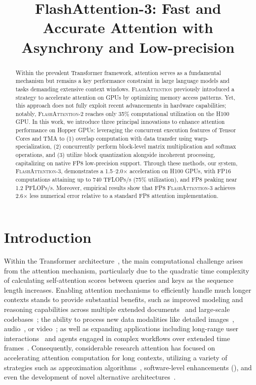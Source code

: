 \title{FlashAttention-3: Fast and Accurate Attention with Asynchrony and Low-precision}

\begin{abstract}
Within the prevalent Transformer framework, attention serves as a fundamental mechanism but remains a key performance constraint in large language models and tasks demanding extensive context windows. \textsc{FlashAttention} previously introduced a strategy to accelerate attention on GPUs by optimizing memory access patterns. Yet, this approach does not fully exploit recent advancements in hardware capabilities; notably, \textsc{FlashAttention-2} reaches only 35\% computational utilization on the H100 GPU. In this work, we introduce three principal innovations to enhance attention performance on Hopper GPUs: leveraging the concurrent execution features of Tensor Cores and TMA to (1) overlap computation with data transfer using warp-specialization, (2) concurrently perform block-level matrix multiplication and softmax operations, and (3) utilize block quantization alongside incoherent processing, capitalizing on native FP8 low-precision support. Through these methods, our system, \textsc{FlashAttention-3}, demonstrates a 1.5--2.0$\times$ acceleration on H100 GPUs, with FP16 computations attaining up to 740 TFLOPs/s (75\% utilization), and FP8 peaking near 1.2 PFLOPs/s. Moreover, empirical results show that FP8 \textsc{FlashAttention-3} achieves 2.6$\times$ less numerical error relative to a standard FP8 attention implementation.
\end{abstract}

\section{Introduction}
\label{sec:intro}

Within the Transformer architecture~\citep{vaswani2017attention}, the main computational challenge arises from the attention mechanism, particularly due to the quadratic time complexity of calculating self-attention scores between queries and keys as the sequence length increases. Enabling attention mechanisms to efficiently handle much longer contexts stands to provide substantial benefits, such as improved modeling and reasoning capabilities across multiple extended documents~\citep{guo2021longt5,shaham2022scrolls,peng2023yarn} and large-scale codebases~\citep{roziere2023code, li2023starcoder}; the ability to process new data modalities like detailed images~\citep{chen2022scaling}, audio~\citep{gulati2020conformer}, or video~\citep{ho2022video}; as well as expanding applications including long-range user interactions~\citep{sun2019bert4rec} and agents engaged in complex workflows over extended time frames~\citep{yao2022react}. Consequently, considerable research attention has focused on accelerating attention computation for long contexts, utilizing a variety of strategies such as approximation algorithms~\citep{katharopoulos2020transformers,choromanski2020rethinking,
tay2020efficient}, software-level enhancements (\citep{rabe2021self,dao2022flashattention,kwon2023efficient}), and even the development of novel alternative architectures~\citep{peng2023rwkv,sun2023retentive,gu2023mamba}.

